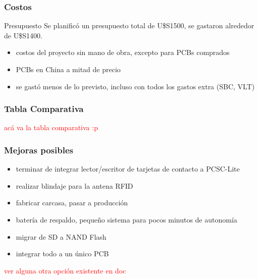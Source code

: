 \documentclass{beamer}
\begin{document}
\begin{frame}
	\frametitle{Costos}
	\begin{block}{Presupuesto}
		Se planificó un presupuesto total de U\$S1500, se gastaron alrededor de U\$S1400.
	\end{block}

	\begin{itemize}
		\item costos del proyecto sin mano de obra, excepto para PCBs comprados

		\bigskip
		\item PCBs en China a mitad de precio

		\bigskip
		\item se gastó menos de lo previsto, incluso con todos los gastos extra (SBC, VLT)
	\end{itemize}
\end{frame}	

\begin{frame}
	\frametitle{Tabla Comparativa}
	\textcolor{red}{acá va la tabla comparativa :p}
\end{frame}	

\begin{frame}
	\frametitle{Mejoras posibles}
	\begin{itemize}
		\item terminar de integrar lector/escritor de tarjetas de contacto a PCSC-Lite

		\bigskip		
		\item realizar blindaje para la antena RFID
		
		\bigskip		
		\item fabricar carcasa, pasar a producción
		
		\bigskip		
		\item batería de respaldo, pequeño sistema para pocos minutos de autonomía
		
		\bigskip		
		\item migrar de SD a NAND Flash

		\bigskip		
		\item integrar todo a un único PCB
		
	\end{itemize}		
	\textcolor{red}{ver alguna otra opción existente en doc}
\end{frame}	
\end{document}
